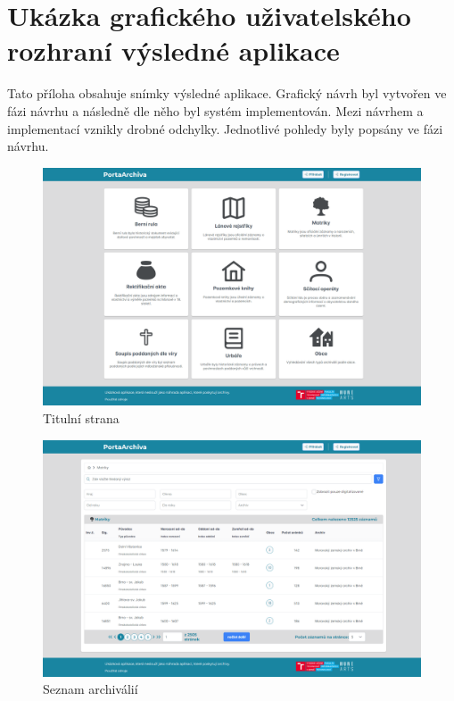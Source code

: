 \chapter{Ukázka grafického uživatelského rozhraní výsledné aplikace}
\label{appendix:client-ui}
Tato příloha obsahuje snímky výsledné aplikace. Grafický návrh byl vytvořen ve fázi návrhu a následně dle něho byl systém implementován. Mezi návrhem a implementací vznikly drobné odchylky. Jednotlivé pohledy byly popsány ve fázi návrhu.


\begin{figure}[htbp]
\centering
    \includegraphics[scale=.22]{obrazky-figures/implementation/productScreenshots/main.png}
    \caption{Titulní strana}
\end{figure}

\begin{figure}[htbp]
\centering
    \includegraphics[scale=.22]{obrazky-figures/implementation/productScreenshots/list.png}
    \caption{Seznam archiválií}
\end{figure}



